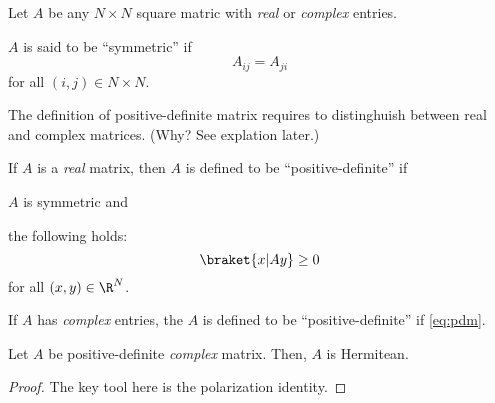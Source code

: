 \begin{approfondimento}
   Let $A$ be any $N\times N$ square matric with \emph{real} or \emph{complex}
   entries.
   \begin{definition}
      $A$ is said to be ``symmetric'' if
      \begin{dmath*}
	 A_{ij} = A_{ji}
      \end{dmath*}
      for all $(i,j) \in N\times N$.
   \end{definition}
   The definition of positive-definite matrix requires to distinghuish between
   real and complex matrices. (Why? See explation later.)
   \begin{definition}
      \begin{aenumerate}
      \item
	 If $A$ is a \emph{real} matrix, then $A$ is defined to be
	 ``positive-definite'' if
	 \begin{inparaenum}[a)]
	 \item $A$ is symmetric and
	 \item the following holds:
	    \begin{dmath}[label={pdm}]
	       \braket{x|Ay} \geq 0
	    \end{dmath} 
	    for all $(x,y)\in\R^{N}$.
	 \end{inparaenum}
      \item If $A$ has \emph{complex} entries, the $A$ is defined to be
	 ``positive-definite'' if \cref{eq:pdm}.
      \end{aenumerate}
   \end{definition}
   \begin{theorem}
      Let $A$ be positive-definite \emph{complex} matrix.
      Then, $A$ is Hermitean.
   \end{theorem}
   \begin{proof}
      The key tool here is the polarization identity.
   \end{proof}

\end{approfondimento}

